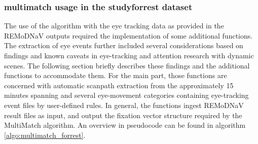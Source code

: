 \documentclass[a4paper, 12pt]{scrreprt}
\begin{document}
\subsubsection{multimatch usage in the studyforrest dataset}\label{sec:multimatch_forrest}
The use of the algorithm with the eye tracking data as provided in the REMoDNaV outputs required the implementation of some additional functions.
The extraction of eye events further included several considerations based on findings and known caveats in eye-tracking and attention research with dynamic scenes. The following section briefly describes these findings and the additional functions to accommodate them. For the main part, those functions are concerned with automatic scanpath extraction from the approximately 15 minutes spanning and several eye-movement categories containing eye-tracking event files by user-defined rules. In general, the functions ingest REMoDNaV result files as input, and output the fixation vector structure required by the MultiMatch algorithm. An overview in pseudocode can be found in algorithm \ref{algo:multimatch_forrest}. \newline
\end{document}
